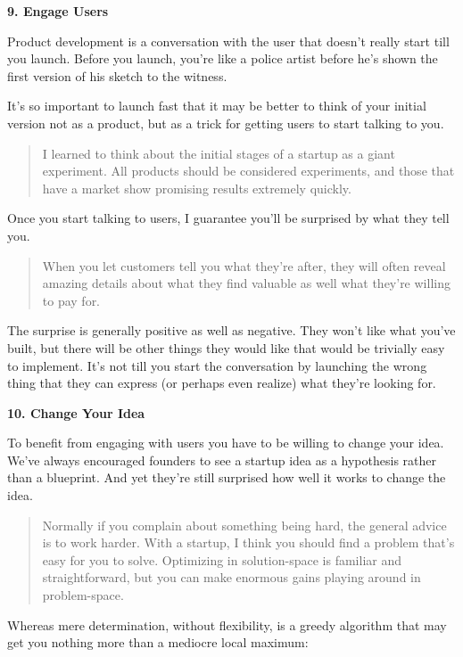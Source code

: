 \documentclass[12pt]{book}
\begin{document}
\textbf{9. Engage Users}

Product development is a conversation with the user that doesn't really
start till you launch. Before you launch, you're like a police artist
before he's shown the first version of his sketch to the witness.

It's so important to launch fast that it may be better to think of your
initial version not as a product, but as a trick for getting users to
start talking to you.

\begin{quote}
I learned to think about the initial stages of a startup as a giant
experiment. All products should be considered experiments, and those
that have a market show promising results extremely quickly.
\end{quote}

Once you start talking to users, I guarantee you'll be surprised by what
they tell you.

\begin{quote}
When you let customers tell you what they're after, they will often
reveal amazing details about what they find valuable as well what
they're willing to pay for.
\end{quote}

The surprise is generally positive as well as negative. They won't like
what you've built, but there will be other things they would like that
would be trivially easy to implement. It's not till you start the
conversation by launching the wrong thing that they can express (or
perhaps even realize) what they're looking for.

\textbf{10. Change Your Idea}

To benefit from engaging with users you have to be willing to change
your idea. We've always encouraged founders to see a startup idea as a
hypothesis rather than a blueprint. And yet they're still surprised how
well it works to change the idea.

\begin{quote}
Normally if you complain about something being hard, the general advice
is to work harder. With a startup, I think you should find a problem
that's easy for you to solve. Optimizing in solution-space is familiar
and straightforward, but you can make enormous gains playing around in
problem-space.
\end{quote}

Whereas mere determination, without flexibility, is a greedy algorithm
that may get you nothing more than a mediocre local maximum:
\end{document}
